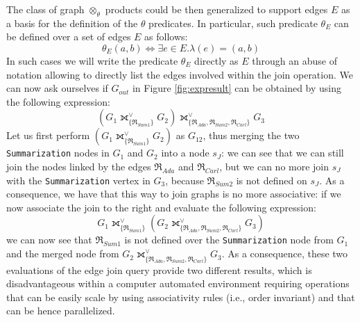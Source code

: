	The class of  graph  $\otimes_\theta$ products could be then generalized to support edges $E$ as a basis for the definition of the $\theta$ predicates. In particular, such predicate $\theta_E$ can be defined over a set of edges $E$ as follows:
	\[\theta_E(a,b)\Leftrightarrow \exists e\in E. \lambda(e)=(a,b)\]
	In such cases we will write the predicate $\theta_E$ directly as $E$ through an abuse of notation allowing to directly list the edges involved within the join operation. We can now ask ourselves if $G_{out}$ in Figure \ref{fig:expresult} can be obtained by using the following expression:
\[(G_1\fullouterjoin^\vee_{\{\Re_{Sum1}\}}G_2)\fullouterjoin^\vee_{\{\Re_{Ada},\Re_{Sum2},\Re_{Carl}\}}G_3\]
	Let us first perform $(G_1\fullouterjoin^\vee_{\{\Re_{Sum1}\}}G_2)$ as $G_{12}$, thus merging the two \texttt{Summarization} nodes in $G_1$ and $G_2$ into a node $s_J$: we can see that we can still join the nodes linked by the edges $\Re_{Ada}$ and $\Re_{Carl}$, but we can no more join $s_J$ with the \texttt{Summarization} vertex in $G_3$, because $\Re_{Sum2}$ is not defined on $s_J$. As a consequence, we have that this way to join graphs is no more associative: if we now associate the join to the right and evaluate the following expression:
\[G_1\fullouterjoin^\vee_{\{\Re_{Sum1}\}}(G_2\fullouterjoin^\vee_{\{\Re_{Ada},\Re_{Sum2},\Re_{Carl}\}}G_3)\]
	we can now see that $\Re_{Sum1}$ is not defined over the \texttt{Summarization} node from $G_1$ and the merged node from $G_2\fullouterjoin^\vee_{\{\Re_{Ada},\Re_{Sum2},\Re_{Carl}\}}G_3$. As a consequence, these two evaluations of the edge join query provide two different results, which is disadvantageous within a computer automated environment requiring operations that can be easily scale by using associativity rules (i.e., order invariant) and that can be hence parallelized.
	
